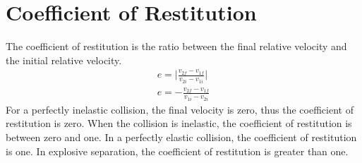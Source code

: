 \documentclass{article}
\theoremstyle{mytheoremstyle}
\theoremstyle{mytheoremstyle}
\theoremstyle{myproblemstyle}
\begin{document}
    \section*{Coefficient of Restitution}
    The coefficient of restitution is the ratio between the final relative
    velocity and the initial relative velocity.
    \begin{align*}
        e = \bigg|\frac{ v_{2f} - v_{1f} }{v_{2i} - v_{1i} } \bigg| \\
        e = - \frac{ v_{2f} - v_{1f} }{ v_{1i} - v_{2i} }
    \end{align*}
    For a perfectly inelastic collision, the final velocity is zero, thus the
    coefficient of restitution is zero. When the collision is inelastic, the
    coefficient of restitution is between zero and one. In a perfectly elastic
    collision, the coefficient of restitution is one. In explosive separation,
    the coefficient of restitution is greater than one.
\end{document}
